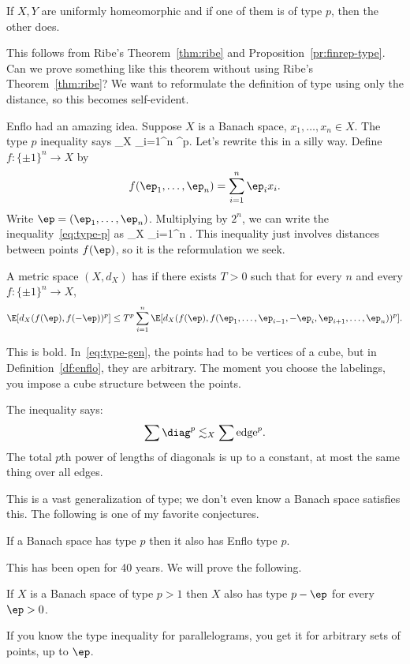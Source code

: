 \begin{cor}
If $X,Y$ are uniformly homeomorphic and if one of them is of type $p$, then the other does. 
\end{cor}
This follows from Ribe's Theorem~\ref{thm:ribe} and Proposition~\ref{pr:finrep-type}. Can we prove something like this theorem without using Ribe's Theorem~\ref{thm:ribe}?
We want to reformulate the definition of type using only the distance, so this becomes self-evident.

Enflo had an amazing idea. 
Suppose $X$ is a Banach space, $x_1,\ldots, x_n\in X$. The type $p$ inequality  says 
\E{} \lesssim_X \sum_{i=1}^n ^p.
\eeq
Let's rewrite this in a silly way. Define $f:\{\pm 1\}^n\to X$ by
\[
f(\ep_1,\ldots, \ep_n)=\sum_{i=1}^n \ep_i x_i.
\]
Write $\ep=(\ep_1,\ldots, \ep_n)$. Multiplying by $2^n$, we can write the inequality~\eqref{eq:type-p} as
\E{}\lesssim_X
\sum_{i=1}^n \E{}.
\eeq
This inequality just involves distances between points $f(\ep)$, so it is the reformulation we seek.

\begin{df}
A metric space $(X,d_X)$ has  if there exists $T>0$ such that for every $n$ and every $f:\{\pm 1\}^n\to X$,
\[
\E[d_X(f(\ep), f(-\ep))^p]\le T^p \sum_{i=1}^n \E[ d_X(f(\ep), f(\ep_1,\ldots, \ep_{i-1}, -\ep_i, \ep_{i+1},\ldots, \ep_n))^p].
\]
\end{df}
This is bold. 
In~\eqref{eq:type-gen}, the points had to be vertices of a cube, but in Definition~\ref{df:enflo}, they are arbitrary. The moment you choose the labelings, you impose a cube structure between the points. %


The inequality says:
\[
\sum \diag^p\lesssim_X\sum \text{edge}^p.
\]
The total $p$th power of lengths of diagonals is up to a constant, at most the same thing over all edges.

This is a vast generalization of type; we don't even know a Banach space satisfies this.
The following is one of my favorite conjectures.
\begin{conj}[Enflo]
If a Banach space has type $p$ then it also has Enflo type $p$.
\end{conj}
This has been open for 40 years. We will prove the following.
\begin{thm}
If $X$ is a Banach space of type $p>1$ then $X$ also has type $p-\ep$ for every $\ep>0$.
\end{thm}
If you know the type inequality for parallelograms, you get it for arbitrary sets of points, up to $\ep$.

